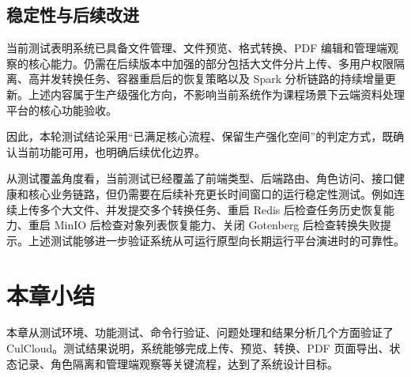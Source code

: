 \subsection{稳定性与后续改进}

当前测试表明系统已具备文件管理、文件预览、格式转换、PDF 编辑和管理端观察的核心能力。仍需在后续版本中加强的部分包括大文件分片上传、多用户权限隔离、高并发转换任务、容器重启后的恢复策略以及 Spark 分析链路的持续增量更新。上述内容属于生产级强化方向，不影响当前系统作为课程场景下云端资料处理平台的核心功能验收。

因此，本轮测试结论采用“已满足核心流程、保留生产强化空间”的判定方式，既确认当前功能可用，也明确后续优化边界。

从测试覆盖角度看，当前测试已经覆盖了前端类型、后端路由、角色访问、接口健康和核心业务链路，但仍需要在后续补充更长时间窗口的运行稳定性测试。例如连续上传多个大文件、并发提交多个转换任务、重启 Redis 后检查任务历史恢复能力、重启 MinIO 后检查对象列表恢复能力、关闭 Gotenberg 后检查转换失败提示。上述测试能够进一步验证系统从可运行原型向长期运行平台演进时的可靠性。

\section{本章小结}

本章从测试环境、功能测试、命令行验证、问题处理和结果分析几个方面验证了 CulCloud。测试结果说明，系统能够完成上传、预览、转换、PDF 页面导出、状态记录、角色隔离和管理端观察等关键流程，达到了系统设计目标。
